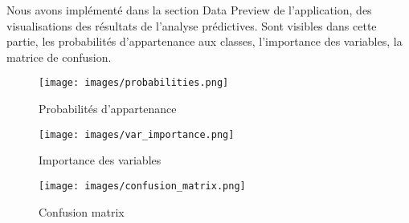 \documentclass{rapport}
\begin{document}

Nous avons implémenté dans la section Data Preview de l'application, des visualisations des résultats de l'analyse prédictives. Sont visibles dans cette partie, les probabilités d'appartenance aux classes, l'importance des variables, la matrice de confusion.

\begin{figure}[h!]
    \centering
    \texttt{[image: images/probabilities.png]}
    \caption{Probabilités d'appartenance}
    \label{fig:proba}
\end{figure}

\begin{figure}[h!]
    \centering
    \texttt{[image: images/var\_importance.png]}
    \caption{Importance des variables}
    \label{fig:var_importance}
\end{figure}

\begin{figure}[h!]
    \centering
    \texttt{[image: images/confusion\_matrix.png]}
    \caption{Confusion matrix}
    \label{fig:matrix}
\end{figure}
\end{document}
